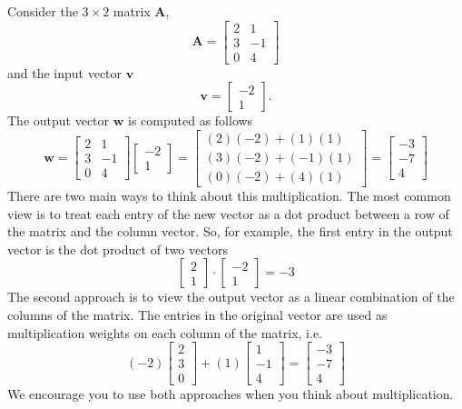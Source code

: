 Consider the $3 \times 2$ matrix $\mathbf{A}$,
\[ \mathbf{A} =
\left[\begin{array}{rr}
2 & 1 \\
3 & -1 \\
0 & 4
\end{array}\right]
\]
and the input vector $\mathbf{v}$
\[ \mathbf{v} =
\left[\begin{array}{rr}
-2 \\
1
\end{array}\right].
\]
The output vector $\mathbf{w}$ is computed as follows
\[ \mathbf{w} =
\left[\begin{array}{rr}
2 & 1 \\
3 & -1 \\
0 & 4
\end{array}\right]
\left[\begin{array}{rr}
-2  \\
1
\end{array}\right]
=
\left[
\begin{array}{cc}
(2)(-2) + (1)(1) \\
(3)(-2) + (-1)(1) \\
(0)(-2) + (4)(1)
\end{array}
\right]
=
\left[
\begin{array}{rr}
-3 \\
-7 \\
4
\end{array}
\right]
\]
There are two main ways to think about this multiplication. The most common view is to treat each entry of the new vector as a dot product between a row of the matrix and the column vector. So, for example, the first entry in the output vector is the dot product of two vectors
\[
\left[
\begin{array}{rr}
2 \\
1
\end{array}
\right]
\cdot
\left[
\begin{array}{rr}
-2 \\
1
\end{array}
\right]
= -3
\]
The second approach is to view the output vector as a linear combination of the columns of the matrix. The entries in the original vector are used as multiplication weights on each column of the matrix, i.e.
\[
(-2) \left[
\begin{array}{rr}
2 \\
3 \\
0
\end{array}
\right]
+
(1) \left[
\begin{array}{rr}
1 \\
-1 \\
4
\end{array}
\right]
=
\left[
\begin{array}{rr}
-3 \\
-7 \\
4
\end{array}
\right]
\]
We encourage you to use both approaches when you think about multiplication.

